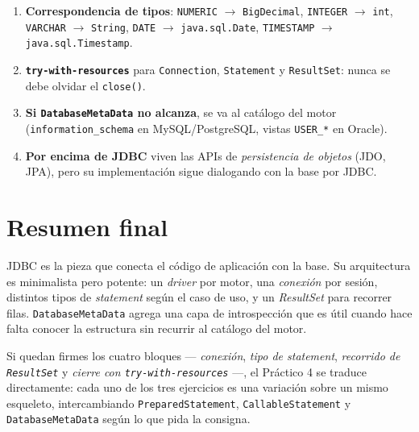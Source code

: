 \documentclass[11pt,a4paper]{article}
\begin{document}
\begin{enumerate}
    PK, FK, índices, procedimientos, esquemas. Es la herramienta del
    Ejercicio 3.
    \item \textbf{Correspondencia de tipos}: \texttt{NUMERIC} $\to$
    \texttt{BigDecimal}, \texttt{INTEGER} $\to$ \texttt{int},
    \texttt{VARCHAR} $\to$ \texttt{String}, \texttt{DATE} $\to$
    \texttt{java.sql.Date}, \texttt{TIMESTAMP} $\to$
    \texttt{java.sql.Timestamp}.
    \item \textbf{\texttt{try-with-resources}} para
    \texttt{Connection}, \texttt{Statement} y \texttt{ResultSet}: nunca
    se debe olvidar el \texttt{close()}.
    \item \textbf{Si \texttt{DatabaseMetaData} no alcanza}, se va al
    catálogo del motor (\texttt{information\_schema} en
    MySQL/PostgreSQL, vistas \texttt{USER\_*} en Oracle).
    \item \textbf{Por encima de JDBC} viven las APIs de
    \emph{persistencia de objetos} (JDO, JPA), pero su implementación
    sigue dialogando con la base por JDBC.
\end{enumerate}

\section*{Resumen final}

JDBC es la pieza que conecta el código de aplicación con la base. Su
arquitectura es minimalista pero potente: un \emph{driver} por motor,
una \emph{conexión} por sesión, distintos tipos de \emph{statement}
según el caso de uso, y un \emph{ResultSet} para recorrer filas.
\texttt{DatabaseMetaData} agrega una capa de introspección que es
útil cuando hace falta conocer la estructura sin recurrir al
catálogo del motor.

Si quedan firmes los cuatro bloques --- \emph{conexión}, \emph{tipo de
statement}, \emph{recorrido de \texttt{ResultSet}} y \emph{cierre con
\texttt{try-with-resources}} ---, el Práctico 4 se traduce
directamente: cada uno de los tres ejercicios es una variación sobre
un mismo esqueleto, intercambiando \texttt{PreparedStatement},
\texttt{CallableStatement} y \texttt{DatabaseMetaData} según lo que
pida la consigna.
\end{document}
